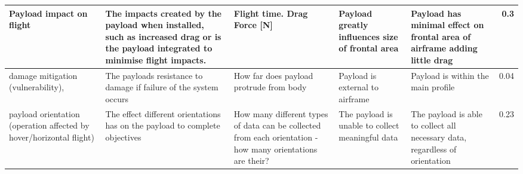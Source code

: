 \begin{table}[]
{\begin{tabular}{|p{2cm}|p{4cm}|p{4cm}|p{4cm}|p{4cm}|r|}
Payload impact on flight                                            & The impacts created by the payload when installed, such as increased drag or is the payload integrated to minimise flight impacts.                            & Flight time. Drag Force {[}N{]}                                                                                  & Payload greatly influences size of frontal area                              & Payload has minimal effect on frontal area of airframe adding little drag                      & 0.3       \\ \hline
damage mitigation (vulnerability),                                  & The payloads resistance to damage if failure of the system occurs                                                                                             & How far does payload protrude from body                                                                          & Payload is external to airframe                                              & Payload is within the main profile                                                             & 0.04      \\ \hline
payload orientation (operation affected by hover/horizontal flight) & The effect different orientations has on the payload to complete objectives                                                                                   & How many different types of data can be collected from each orientation - how many orientations are their?       & The payload is unable to collect meaningful data                             & The payload is able to collect all necessary data, regardless of orientation                   & 0.23      \\ \hline
\end{tabular}%
}
\end{table}






